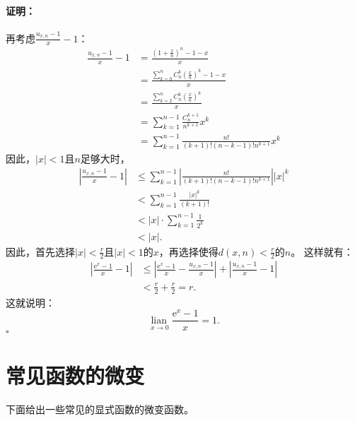 \documentclass[12pt,UTF8]{ctexbook}
\newcommand{\lian}[1]{
    \underset{#1}{\operatorname{lian}\,}
}
\theoremstyle{definition}
\theoremstyle{plain}
\renewenvironment{proof}{\paragraph{\textbf{证明：}}}{\hfill$\square$}
\begin{document}
\begin{appendix}
\begin{proof}
    再考虑$\frac{u_{x,n} - 1}{x} - 1$：
    \begin{align*}
        \frac{u_{x,n} - 1}{x} - 1 &= \frac{\left(1 + \frac{x}{n}\right)^{n} - 1 - x}{x}  \\
        &= \frac{\sum_{k=0}^n C_n^k \left(\frac{x}{n}\right)^k - 1 - x}{x}  \\
        &= \frac{\sum_{k=2}^n C_n^k \left(\frac{x}{n}\right)^k}{x}  \\
        &= \sum_{k=1}^{n-1} \frac{C_n^{k+1}}{n^{k+1}} x^k  \\
        &= \sum_{k=1}^{n-1} \frac{n!}{(k+1)!(n-k-1)!n^{k+1}} x^k  
    \end{align*}
    因此，$|x|<1$且$n$足够大时，
    \begin{align*}
        \left| \frac{u_{x,n} - 1}{x} - 1 \right| &\leqslant \sum_{k=1}^{n-1} \left|\frac{n!}{(k+1)!(n-k-1)!n^{k+1}}\right| |x|^k  \\
        &< \sum_{k=1}^{n-1} \frac{|x|^k}{(k+1)!}  \\
        &< |x| \cdot \sum_{k=1}^{n-1} \frac{1}{2^k}  \\
        &< |x|.  
    \end{align*}
    因此，首先选择$|x| < \frac{r}{2}$且$|x|<1$的$x$，再选择使得$d(x, n) < \frac{r}{2}$的$n$。
    这样就有：
    \begin{align*}
        \left|\frac{\mathrm{e}^x - 1}{x} - 1\right| &\leqslant \left|\frac{\mathrm{e}^x - 1}{x} - \frac{u_{x,n} - 1}{x}\right| + \left|\frac{u_{x,n} - 1}{x} - 1\right|  \\
        &< \frac{r}{2} + \frac{r}{2} = r.   
    \end{align*}
    这就说明：
    $$\lian{x\to 0} \frac{\mathrm{e}^x - 1}{x} = 1.$$
\end{proof}

\section{常见函数的微变}

下面给出一些常见的显式函数的微变函数。


\end{appendix}
\end{document}
